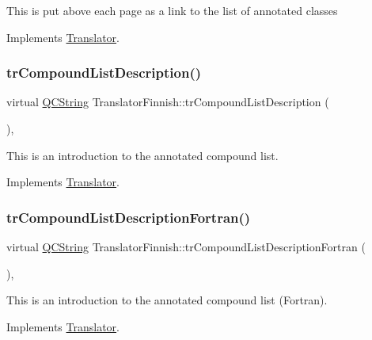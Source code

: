 This is put above each page as a link to the list of annotated classes 

Implements \mbox{\hyperlink{class_translator}{Translator}}.

\mbox{\label{class_translator_finnish_ad99bf257d13c53a7aac51ad400c4470e}} 
\subsubsection{\texorpdfstring{trCompoundListDescription()}{trCompoundListDescription()}}
{\footnotesize\ttfamily virtual \mbox{\hyperlink{class_q_c_string}{Q\+C\+String}} Translator\+Finnish\+::tr\+Compound\+List\+Description (\begin{DoxyParamCaption}{ }\end{DoxyParamCaption})\hspace{0.3cm}{\ttfamily [inline]}, {\ttfamily [virtual]}}

This is an introduction to the annotated compound list. 

Implements \mbox{\hyperlink{class_translator}{Translator}}.

\mbox{\label{class_translator_finnish_a7f93cf056550c2b52504ad0a7aac6a76}} 
\subsubsection{\texorpdfstring{trCompoundListDescriptionFortran()}{trCompoundListDescriptionFortran()}}
{\footnotesize\ttfamily virtual \mbox{\hyperlink{class_q_c_string}{Q\+C\+String}} Translator\+Finnish\+::tr\+Compound\+List\+Description\+Fortran (\begin{DoxyParamCaption}{ }\end{DoxyParamCaption})\hspace{0.3cm}{\ttfamily [inline]}, {\ttfamily [virtual]}}

This is an introduction to the annotated compound list (Fortran). 

Implements \mbox{\hyperlink{class_translator}{Translator}}.


